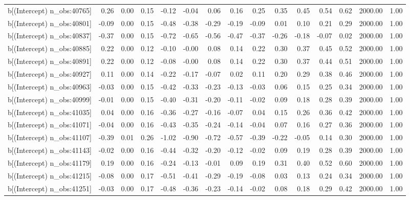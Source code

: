 \begin{table}[ht]
\begin{tabular}{rrrrrrrrrrrrrrr}
  b[(Intercept) n\_obs:40765] & 0.26 & 0.00 & 0.15 & -0.12 & -0.04 & 0.06 & 0.16 & 0.25 & 0.35 & 0.45 & 0.54 & 0.62 & 2000.00 & 1.00 \\ 
  b[(Intercept) n\_obs:40801] & -0.09 & 0.00 & 0.15 & -0.48 & -0.38 & -0.29 & -0.19 & -0.09 & 0.01 & 0.10 & 0.21 & 0.29 & 2000.00 & 1.00 \\ 
  b[(Intercept) n\_obs:40837] & -0.37 & 0.00 & 0.15 & -0.72 & -0.65 & -0.56 & -0.47 & -0.37 & -0.26 & -0.18 & -0.07 & 0.02 & 2000.00 & 1.00 \\ 
  b[(Intercept) n\_obs:40885] & 0.22 & 0.00 & 0.12 & -0.10 & -0.00 & 0.08 & 0.14 & 0.22 & 0.30 & 0.37 & 0.45 & 0.52 & 2000.00 & 1.00 \\ 
  b[(Intercept) n\_obs:40891] & 0.22 & 0.00 & 0.12 & -0.08 & -0.00 & 0.08 & 0.14 & 0.22 & 0.30 & 0.37 & 0.44 & 0.51 & 2000.00 & 1.00 \\ 
  b[(Intercept) n\_obs:40927] & 0.11 & 0.00 & 0.14 & -0.22 & -0.17 & -0.07 & 0.02 & 0.11 & 0.20 & 0.29 & 0.38 & 0.46 & 2000.00 & 1.00 \\ 
  b[(Intercept) n\_obs:40963] & -0.03 & 0.00 & 0.15 & -0.42 & -0.33 & -0.23 & -0.13 & -0.03 & 0.06 & 0.15 & 0.25 & 0.34 & 2000.00 & 1.00 \\ 
  b[(Intercept) n\_obs:40999] & -0.01 & 0.00 & 0.15 & -0.40 & -0.31 & -0.20 & -0.11 & -0.02 & 0.09 & 0.18 & 0.28 & 0.39 & 2000.00 & 1.00 \\ 
  b[(Intercept) n\_obs:41035] & 0.04 & 0.00 & 0.16 & -0.36 & -0.27 & -0.16 & -0.07 & 0.04 & 0.15 & 0.26 & 0.36 & 0.42 & 2000.00 & 1.00 \\ 
  b[(Intercept) n\_obs:41071] & -0.04 & 0.00 & 0.16 & -0.43 & -0.35 & -0.24 & -0.14 & -0.04 & 0.07 & 0.16 & 0.27 & 0.36 & 2000.00 & 1.00 \\ 
  b[(Intercept) n\_obs:41107] & -0.39 & 0.01 & 0.26 & -1.02 & -0.90 & -0.72 & -0.57 & -0.39 & -0.22 & -0.05 & 0.14 & 0.30 & 2000.00 & 1.00 \\ 
  b[(Intercept) n\_obs:41143] & -0.02 & 0.00 & 0.16 & -0.44 & -0.32 & -0.20 & -0.12 & -0.02 & 0.09 & 0.19 & 0.28 & 0.39 & 2000.00 & 1.00 \\ 
  b[(Intercept) n\_obs:41179] & 0.19 & 0.00 & 0.16 & -0.24 & -0.13 & -0.01 & 0.09 & 0.19 & 0.31 & 0.40 & 0.52 & 0.60 & 2000.00 & 1.00 \\ 
  b[(Intercept) n\_obs:41215] & -0.08 & 0.00 & 0.17 & -0.51 & -0.41 & -0.29 & -0.19 & -0.08 & 0.03 & 0.13 & 0.24 & 0.34 & 2000.00 & 1.00 \\ 
  b[(Intercept) n\_obs:41251] & -0.03 & 0.00 & 0.17 & -0.48 & -0.36 & -0.23 & -0.14 & -0.02 & 0.08 & 0.18 & 0.29 & 0.42 & 2000.00 & 1.00 \\ 

\end{tabular}
\end{table}
